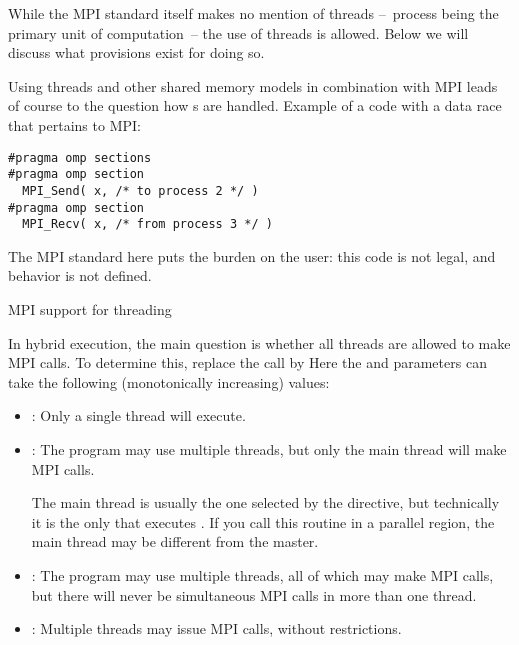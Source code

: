
While the MPI standard itself makes no mention of threads
--~process being the primary unit of computation~--
the use of threads is allowed.
Below we will discuss what provisions exist for doing so.

Using threads and other shared memory models in combination with MPI
leads of course to the question how
s are handled.
Example of a code with a data race that pertains to MPI:
\begin{lstlisting}
#pragma omp sections
#pragma omp section
  MPI_Send( x, /* to process 2 */ )
#pragma omp section
  MPI_Recv( x, /* from process 3 */ )
\end{lstlisting}
The MPI standard here puts the burden on the user:
this code is not legal, and behavior is not defined.

 {MPI support for threading}
\label{sec:init-thread}
\label{sec:ref:mpi-thread}


In hybrid execution, the main question is whether all threads
are allowed to make MPI calls. To determine this,
replace the  call by
%
%
Here the  and  parameters can take the following
(monotonically increasing) values:
\begin{itemize}
\item {}: Only a single thread will
  execute.
\item{}: The program may use multiple
  threads, but only the main thread will make MPI calls.

    The main thread is usually the one selected by the
     directive, but technically it is the only that
    executes . If you call this routine in
    a parallel region, the main thread may be different from the master.
\item{}: The program may use multiple
  threads, all of which may make MPI calls, but there will never be
  simultaneous MPI calls in more than one thread.
\item{}: Multiple threads may issue MPI
  calls, without restrictions.
\end{itemize}

